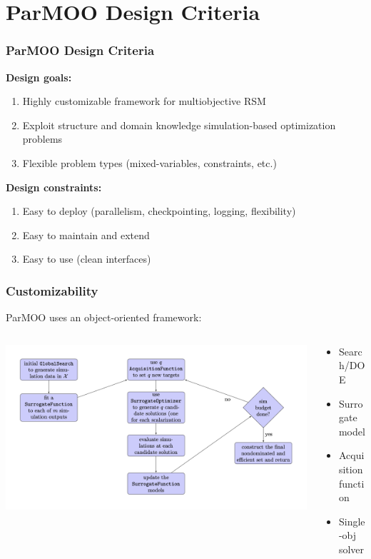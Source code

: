 \documentclass[aspectratio=169]{beamer}
\begin{document}
\section{ParMOO Design Criteria}

\begin{frame}\frametitle{ParMOO Design Criteria}

\textbf{Design goals:}
\begin{enumerate}
\item Highly customizable framework for multiobjective RSM
\item Exploit structure and domain knowledge simulation-based optimization
problems
\item Flexible problem types (mixed-variables, constraints, etc.)
\end{enumerate}

\medskip
\pause

\textbf{Design constraints:}
\begin{enumerate}
\item Easy to deploy (parallelism, checkpointing, logging, flexibility)
\item Easy to maintain and extend
\item Easy to use (clean interfaces)
\end{enumerate}
\end{frame}

\begin{frame}\frametitle{Customizability}
ParMOO uses an object-oriented framework:\\
\begin{columns}
\begin{column}{0.7\textwidth}
\includegraphics[width=\textwidth]{algorithm-flowchart.png}
\end{column}
\begin{column}{0.3\textwidth}
\pause
\begin{itemize}
\item Search/DOE
\item Surrogate model
\item Acquisition function
\item Single-obj solver
\end{itemize}
\end{column}
\end{columns}
\end{frame}
\end{document}
